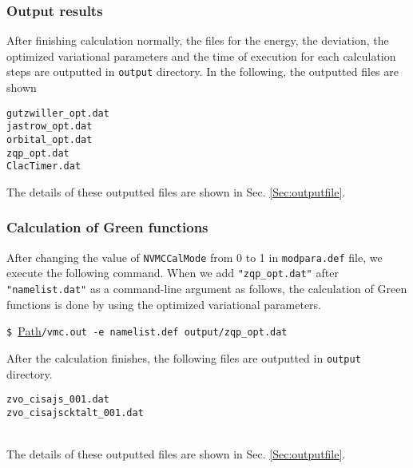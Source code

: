 \subsubsection{Output results}
After finishing calculation normally, the files for the energy, the deviation,
the optimized variational parameters and
the time of execution for each calculation steps are outputted  in \verb|output| directory.
In the following, the outputted files are shown \\
\begin{minipage}{12cm}
\begin{screen}
\begin{verbatim}
gutzwiller_opt.dat
jastrow_opt.dat
orbital_opt.dat
zqp_opt.dat
ClacTimer.dat
\end{verbatim}
\end{screen}
\end{minipage}

The details of these outputted files are shown in Sec. \ref{Sec:outputfile}.\\

\subsubsection{Calculation of Green functions}
After changing the value of \verb|NVMCCalMode| from 0 to 1 in \verb|modpara.def| file, we execute the following command. 
When we add \verb|"zqp_opt.dat"| after \verb|"namelist.dat"| as a command-line argument
as follows,
the calculation of Green functions is done by using the optimized variational parameters. 

\vspace{1cm}\hspace{-0.7cm}
\verb|$ |\underline{Path}\verb|/vmc.out -e namelist.def output/zqp_opt.dat|
\small

After the calculation finishes, the following files are outputted in \verb|output| directory.
\\
\begin{minipage}{12cm}
\begin{screen}
\begin{verbatim}
zvo_cisajs_001.dat
zvo_cisajscktalt_001.dat
\end{verbatim}
\end{screen}
\end{minipage}
\\
The details of these outputted files are shown in Sec. \ref{Sec:outputfile}.\\

